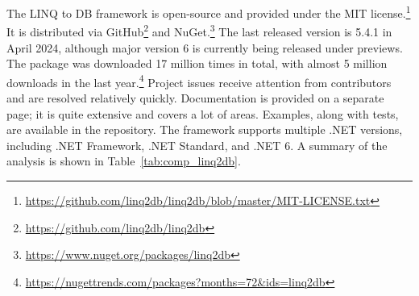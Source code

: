 The LINQ to DB framework is open-source and provided under the MIT license.\footnote{\url{https://github.com/linq2db/linq2db/blob/master/MIT-LICENSE.txt}} It is distributed via GitHub\footnote{\url{https://github.com/linq2db/linq2db}} and NuGet.\footnote{\url{https://www.nuget.org/packages/linq2db}} The last released version is 5.4.1 in April 2024, although major version 6 is currently being released under previews. The package was downloaded 17 million times in total, with almost 5 million downloads in the last year.\footnote{\url{https://nugettrends.com/packages?months=72&ids=linq2db}} Project issues receive attention from contributors and are resolved relatively quickly. Documentation is provided on a separate page; it is quite extensive and covers a lot of areas. Examples, along with tests, are available in the repository. The framework supports multiple .NET versions, including .NET Framework, .NET Standard, and .NET 6. A summary of the analysis is shown in Table~\ref{tab:comp_linq2db}.

